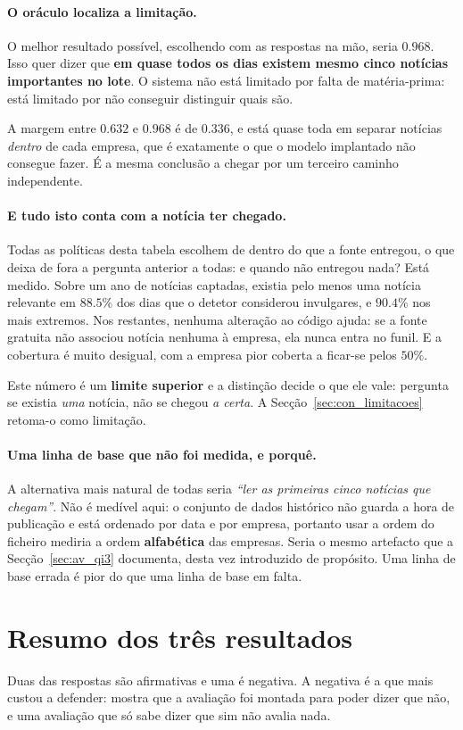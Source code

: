 \paragraph{O oráculo localiza a limitação.}
O melhor resultado possível, escolhendo com as respostas na mão, seria $0.968$. Isso quer dizer
que \textbf{em quase todos os dias existem mesmo cinco notícias importantes no lote}. O sistema não
está limitado por falta de matéria-prima: está limitado por não conseguir distinguir quais são.

A margem entre $0.632$ e $0.968$ é de $0.336$, e está quase toda em separar notícias \emph{dentro}
de cada empresa, que é exatamente o que o modelo implantado não consegue fazer. É a mesma
conclusão a chegar por um terceiro caminho independente.

\paragraph{E tudo isto conta com a notícia ter chegado.}
Todas as políticas desta tabela escolhem de dentro do que a fonte entregou, o que deixa de fora a
pergunta anterior a todas: e quando não entregou nada? Está medido. Sobre um ano de notícias
captadas, existia pelo menos uma notícia relevante em $88.5\%$ dos dias que o detetor considerou
invulgares, e $90.4\%$ nos mais extremos. Nos restantes, nenhuma alteração ao código ajuda: se a
fonte gratuita não associou notícia nenhuma à empresa, ela nunca entra no funil. E a cobertura é
muito desigual, com a empresa pior coberta a ficar-se pelos $50\%$.

Este número é um \textbf{limite superior} e a distinção decide o que ele vale: pergunta se existia
\emph{uma} notícia, não se chegou \emph{a certa}. A Secção~\ref{sec:con_limitacoes} retoma-o como
limitação.

\paragraph{Uma linha de base que não foi medida, e porquê.}
A alternativa mais natural de todas seria \emph{``ler as primeiras cinco notícias que chegam''}.
Não é medível aqui: o conjunto de dados histórico não guarda a hora de publicação e está ordenado
por data e por empresa, portanto usar a ordem do ficheiro mediria a ordem \textbf{alfabética} das
empresas. Seria o mesmo artefacto que a Secção~\ref{sec:av_qi3} documenta, desta vez introduzido de
propósito. Uma linha de base errada é pior do que uma linha de base em falta.

\section{Resumo dos três resultados}
\label{sec:av_resumo}


Duas das respostas são afirmativas e uma é negativa. A negativa é a que mais custou a
defender: mostra que a avaliação foi montada para poder dizer que não, e uma avaliação que só sabe
dizer que sim não avalia nada.
